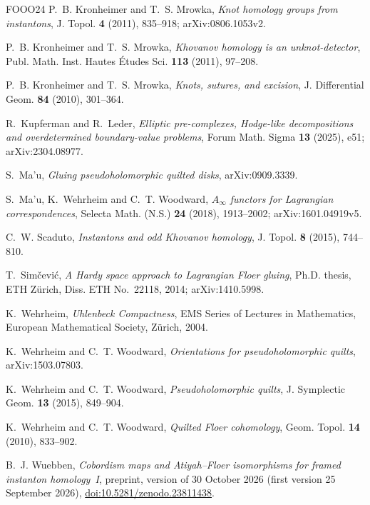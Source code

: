 \documentclass[11pt]{amsart}
\theoremstyle{definition}
\theoremstyle{remark}
\theoremstyle{plain}
\numberwithin{equation}{section}
\begin{document}
\begin{thebibliography}{FOOO24}
P.~B. Kronheimer and T.~S. Mrowka,
\emph{Knot homology groups from instantons},
J. Topol. \textbf{4} (2011), 835--918; arXiv:0806.1053v2.

P.~B. Kronheimer and T.~S. Mrowka,
\emph{Khovanov homology is an unknot-detector},
Publ. Math. Inst. Hautes \'Etudes Sci. \textbf{113}
(2011), 97--208.

P.~B. Kronheimer and T.~S. Mrowka,
\emph{Knots, sutures, and excision},
J. Differential Geom. \textbf{84} (2010), 301--364.

R.~Kupferman and R.~Leder,
\emph{Elliptic pre-complexes, Hodge-like decompositions and
 overdetermined boundary-value problems}, Forum Math. Sigma \textbf{13} (2025), e51;
arXiv:2304.08977.

S.~Ma'u, \emph{Gluing pseudoholomorphic quilted disks},
arXiv:0909.3339.

S.~Ma'u, K.~Wehrheim and C.~T. Woodward,
\emph{$A_\infty$ functors for Lagrangian correspondences},
Selecta Math. (N.S.) \textbf{24} (2018), 1913--2002;
arXiv:1601.04919v5.

C.~W. Scaduto, \emph{Instantons and odd Khovanov homology},
J. Topol. \textbf{8} (2015), 744--810.

T.~Sim\v{c}evi\'c, \emph{A Hardy space approach to Lagrangian Floer
gluing}, Ph.D. thesis, ETH Z\"urich, Diss. ETH No.~22118, 2014;
arXiv:1410.5998.

K.~Wehrheim, \emph{Uhlenbeck Compactness}, EMS Series of Lectures in
Mathematics, European Mathematical Society, Z\"urich, 2004.

K.~Wehrheim and C.~T. Woodward,
\emph{Orientations for pseudoholomorphic quilts},
arXiv:1503.07803.

K.~Wehrheim and C.~T. Woodward,
\emph{Pseudoholomorphic quilts},
J. Symplectic Geom. \textbf{13} (2015), 849--904.

K.~Wehrheim and C.~T. Woodward,
\emph{Quilted Floer cohomology},
Geom. Topol. \textbf{14} (2010), 833--902.

B.~J. Wuebben, \emph{Cobordism maps and Atiyah--Floer isomorphisms
for framed instanton homology~I}, preprint, version of 30 October 2026 (first version
25 September 2026),
\href{https://doi.org/10.5281/zenodo.23811438}{doi:10.5281/zenodo.23811438}.


\end{thebibliography}
\end{document}
